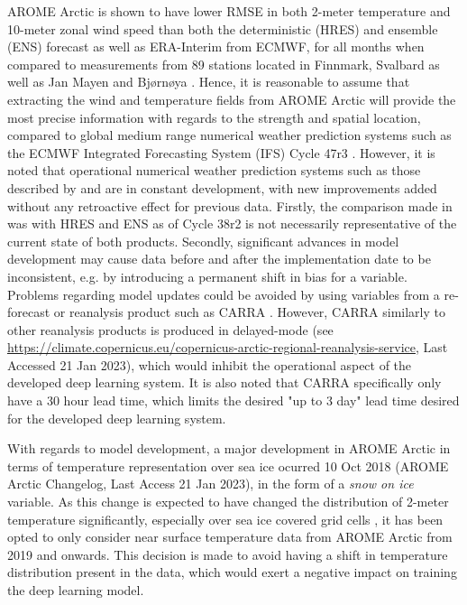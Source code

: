 \documentclass[../main/thesis.tex]{subfiles}
\begin{document}
AROME Arctic is shown to have lower RMSE in both 2-meter temperature and 10-meter zonal wind speed than both the deterministic (HRES) and ensemble (ENS) forecast as well as ERA-Interim from ECMWF, for all months when compared to measurements from 89 stations located in Finnmark, Svalbard as well as Jan Mayen and Bjørnøya \citep{Mueller2017}. Hence, it is reasonable to assume that extracting the wind and temperature fields from AROME Arctic will provide the most precise information with regards to the strength and spatial location, compared to global medium range numerical weather prediction systems such as the ECMWF Integrated Forecasting System (IFS) Cycle 47r3 \citep{Haiden2022}. However, it is noted that operational numerical weather prediction systems such as those described by \citet{Mueller2017} and \citet{Haiden2022} are in constant development, with new improvements added without any retroactive effect for previous data. Firstly, the comparison made in \citet{Mueller2017} was with HRES and ENS as of Cycle 38r2 \cite{Bauer2013} is not necessarily representative of the current state of both products. Secondly, significant advances in model development may cause data before and after the implementation date to be inconsistent, e.g. by introducing a permanent shift in bias for a variable. Problems regarding model updates could be avoided by using variables from a re-forecast or reanalysis product such as CARRA \citep{Koeltzow2022}. However, CARRA similarly to other reanalysis products is produced in delayed-mode (see \url{https://climate.copernicus.eu/copernicus-arctic-regional-reanalysis-service}, Last Accessed 21 Jan 2023), which would inhibit the operational aspect of the developed deep learning system. It is also noted that CARRA specifically only have a 30 hour lead time, which limits the desired "up to 3 day" lead time desired for the developed deep learning system.

With regards to model development, a major development in AROME Arctic in terms of temperature representation over sea ice ocurred 10 Oct 2018 (AROME Arctic Changelog, Last Access 21 Jan 2023), in the form of a \textit{snow on ice} variable. As this change is expected to have changed the distribution of 2-meter temperature significantly, especially over sea ice covered grid cells \citep{Batrak2018,Batrak2019}, it has been opted to only consider near surface temperature data from AROME Arctic from 2019 and onwards. This decision is made to avoid having a shift in temperature distribution present in the data, which would exert a negative impact on training the deep learning model.
\end{document}
